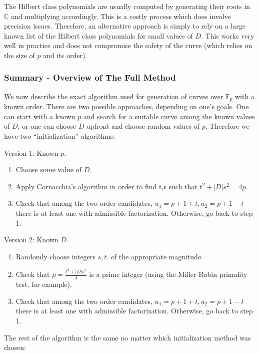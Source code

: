 \documentclass[11pt,english]{article}
\begin{document}
The Hilbert class polynomials are usually computed by generating their roots in $\mathbb{C}$ and multiplying accordingly. This is a costly process which
does involve precision issues. Therefore, an alternative approach is simply to rely on a large known list of the Hilbert class polynomials for small values of $D$. This
works very well in practice and does not compromise the safety of the curve (which relies on the size of $p$ and its order).

\subsubsection{Summary - Overview of The Full Method}
We now describe the exact algorithm used for generation of curves over $\mathbb{F}_p$ with a known order. There are two possible approaches, depending on one's goals.
One can start with a known $p$ and search for a suitable curve among the known values of $D$, or one can choose $D$ upfront and choose random values of $p$. Therefore we have
two ``initialization'' algorithms:

Version 1: Known $p$.
\begin{enumerate}
 \item Choose some value of $D$.
 \item Apply Cornacchia's algorithm in order to find t,s such that $t^2+|D|s^2=4p$.
 \item Check that among the two order candidates, $u_1=p+1+t,u_2=p+1-t$ there is at least one with admissible factorization. Otherwise, go back to step 1.
\end{enumerate}

Version 2: Known $D$.
\begin{enumerate}
 \item Randomly choose integers $s,t$. of the appropriate magnitude.
 \item Check that $p=\frac{t^2+|D|s^2}{4}$ is a prime integer (using the Miller-Rabin primality test, for example).
 \item Check that among the two order candidates, $u_1=p+1+t,u_2=p+1-t$ there is at least one with admissible factorization. Otherwise, go back to step 1.
\end{enumerate}

The rest of the algorithm is the same no matter which initialization method was chosen:
\end{document}

